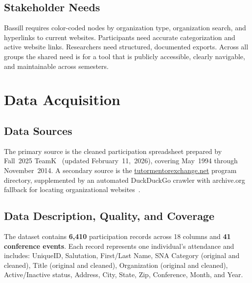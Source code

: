 \documentclass[10pt,twocolumn,letterpaper]{article}
\begin{document}
\subsection{Stakeholder Needs}

Bassill requires color-coded nodes by organization type, organization
search, and hyperlinks to current websites. Participants need
accurate categorization and active website links. Researchers need
structured, documented exports. Across all groups the shared need is
for a tool that is publicly accessible, clearly navigable, and
maintainable across semesters.

\section{Data Acquisition}

\subsection{Data Sources}

The primary source is the cleaned participation spreadsheet prepared
by Fall~2025 TeamK~\cite{teamk2025} (updated February~11,~2026),
covering May~1994 through November~2014. A secondary source is the
\href{https://tutormentorexchange.net}{tutormentorexchange.net}
program directory, supplemented by an automated DuckDuckGo
crawler with archive.org fallback for locating organizational
websites~\cite{crawler2026}.

\subsection{Data Description, Quality, and Coverage}

The dataset contains \textbf{6,410} participation records across
18 columns and \textbf{41 conference events}. Each record represents
one individual's attendance and includes: UniqueID, Salutation,
First/Last Name, SNA Category (original and cleaned), Title (original
and cleaned), Organization (original and cleaned), Active/Inactive
status, Address, City, State, Zip, Conference, Month, and Year.
\end{document}
